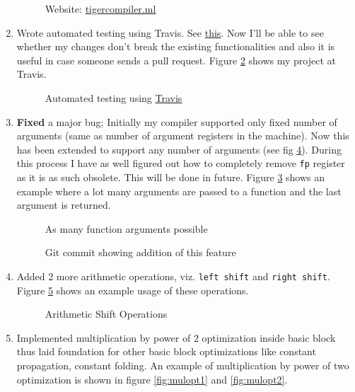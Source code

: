 \begin{enumerate}
	      \begin{figure}
		      \centering
		      \caption{Website: \href{https://tigercompiler.ml}{tigercompiler.ml}}
		      \label{fig:tigercompiler}
	      \end{figure}
	\item Wrote automated testing using Travis. See \href{https://travis-ci.org/sourabh2311/btp}{this}. Now I'll be able to see whether my changes don't break the existing functionalities and also it is useful in case someone sends a pull request. Figure \ref{fig:travis} shows my project at Travis.
	      \begin{figure}
		      \centering
		      \caption{Automated testing using \href{https://travis-ci.org/sourabh2311/btp}{Travis}}
		      \label{fig:travis}
	      \end{figure}
	\item \textbf{Fixed} a major bug; Initially my compiler supported only fixed number of arguments (same as number of argument registers in the machine). Now this has been extended to support any number of arguments (see fig \ref{fig:gitfunargs}). During this process I have as well figured out how to completely remove \texttt{fp} register as it is as such obsolete. This will be done in future. Figure \ref{fig:funargs} shows an example where a lot many arguments are passed to a function and the last argument is returned.
	      \begin{figure}
		      \centering
		      \caption{As many function arguments possible}
		      \label{fig:funargs}
	      \end{figure}
	      \begin{figure}
		      \centering
		      \caption{Git commit showing addition of this feature}
		      \label{fig:gitfunargs}
	      \end{figure}
	\item Added 2 more arithmetic operations, viz. \texttt{left shift} and \texttt{right shift}. Figure \ref{fig:shiftoperations} shows an example usage of these operations.
	      \begin{figure}
		      \centering
		      \caption{Arithmetic Shift Operations}
		      \label{fig:shiftoperations}
	      \end{figure}
	\item Implemented multiplication by power of 2 optimization inside basic block thus laid foundation for other basic block optimizations like constant propagation, constant folding. An example of multiplication by power of two optimization is shown in figure \ref{fig:mulopt1} and \ref{fig:mulopt2}.

\end{enumerate}
